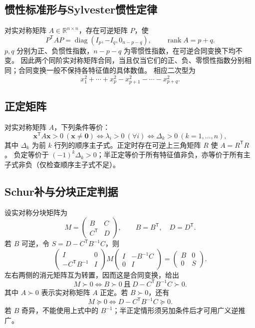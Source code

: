 \documentclass[../main.tex]{subfiles}
\begin{document}
\subsection{惯性标准形与Sylvester惯性定律}
对实对称矩阵 $A\in\mathbb R^{n\times n}$，存在可逆矩阵 $P$，使
\[
P^{\mathsf T}AP=\operatorname{diag}(I_p,-I_q,0_{n-p-q}),\qquad
\operatorname{rank}A=p+q.
\]
$p,q$ 分别为正、负惯性指数，$n-p-q$ 为零惯性指数，在可逆合同变换下均不变。
因此两个同阶实对称矩阵合同，当且仅当它们的正、负、零惯性指数分别相同；合同变换一般不保持各特征值的具体数值。
相应二次型为
\[
x_1^2+\cdots+x_p^2-x_{p+1}^2-\cdots-x_{p+q}^2.
\]
\begin{samepage}
\subsection{正定矩阵}
对实对称矩阵 $A$，下列条件等价：
\[
\bm x^{\mathsf T}A\bm x>0\ (\bm x\ne\bm0)
\iff\lambda_i>0\ (\forall i)
\iff\Delta_k>0\ (k=1,\ldots,n),
\]
其中 $\Delta_k$ 为前 $k$ 行列的顺序主子式。正定时存在可逆上三角矩阵 $R$ 使 $A=R^{\mathsf T}R$。
负定等价于 $(-1)^k\Delta_k>0$；半正定等价于所有特征值非负，亦等价于所有主子式非负（仅检查顺序主子式不足）。
\end{samepage}
\par\pagebreak[0]\begin{samepage}
\subsection{Schur补与分块正定判据}
设实对称分块矩阵为
\[
M=\begin{pmatrix}B&C\\C^{\mathsf T}&D\end{pmatrix},\qquad B=B^{\mathsf T},\quad D=D^{\mathsf T}.
\]
若 $B$ 可逆，令 $S=D-C^{\mathsf T}B^{-1}C$，则
\[
\begin{pmatrix}I&0\\-C^{\mathsf T}B^{-1}&I\end{pmatrix}
M
\begin{pmatrix}I&-B^{-1}C\\0&I\end{pmatrix}
=\begin{pmatrix}B&0\\0&S\end{pmatrix}.
\]
左右两侧的消元矩阵互为转置，因而这是合同变换，给出
\[
M\succ0\iff B\succ0\ \text{且}\ D-C^{\mathsf T}B^{-1}C\succ0.
\]
其中 $A\succ0$ 表示实对称矩阵 $A$ 正定。若 $B\succ0$，还有
\[
M\succeq0\iff D-C^{\mathsf T}B^{-1}C\succeq0.
\]
若 $B$ 奇异，不能使用上式中的 $B^{-1}$；半正定情形须另加条件后才可用广义逆推广。
\par\end{samepage}
\end{document}
